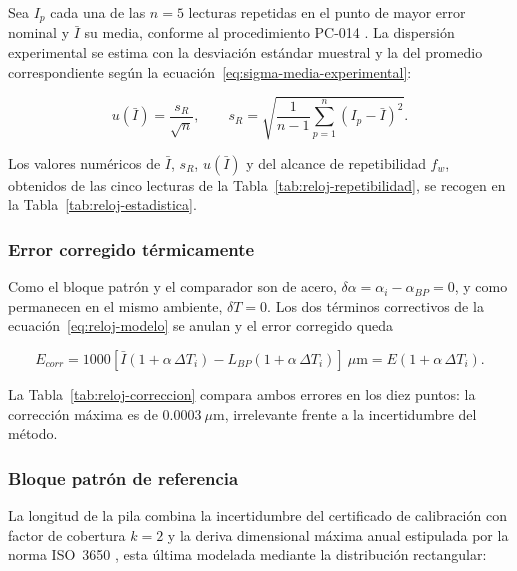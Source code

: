 Sea $I_p$ cada una de las $n = 5$ lecturas repetidas en el punto de mayor error
nominal y $\bar{I}$ su media, conforme al procedimiento PC-014
\parencite{inacal_pc014}. La dispersión experimental se estima con la desviación
estándar muestral y la del promedio correspondiente según la
ecuación~\eqref{eq:sigma-media-experimental}:

\begin{equation}
  u(\bar{I}) = \frac{s_R}{\sqrt{n}},
  \qquad
  s_R = \sqrt{\frac{1}{n-1} \sum_{p=1}^{n} (I_p - \bar{I})^2}.
  \label{eq:reloj-sigma-I}
\end{equation}



Los valores numéricos de $\bar I$, $s_R$, $u(\bar I)$ y del alcance de
repetibilidad $f_w$, obtenidos de las cinco lecturas de la
Tabla~\ref{tab:reloj-repetibilidad}, se recogen en la
Tabla~\ref{tab:reloj-estadistica}.

\subsubsection{Error corregido térmicamente}

Como el bloque patrón y el comparador son de acero,
$\delta\alpha = \alpha_i - \alpha_{BP} = 0$, y como permanecen en el mismo ambiente,
$\delta T = 0$. Los dos términos correctivos de la ecuación~\eqref{eq:reloj-modelo} se
anulan y el error corregido queda

\begin{equation}
    E_{corr} = 1000\left[\bar I(1 + \alpha\,\Delta T_i)
    - L_{BP}(1 + \alpha\,\Delta T_i)\right]\ \mu\text{m}
    = E(1 + \alpha\,\Delta T_i).
    \label{eq:reloj-E-corr}
\end{equation}

La Tabla~\ref{tab:reloj-correccion} compara ambos errores en los diez puntos: la
corrección máxima es de $0.0003\ \mu\text{m}$, irrelevante frente a la incertidumbre
del método.



\subsubsection*{Bloque patrón de referencia}

La longitud de la pila combina la incertidumbre del certificado de calibración con
factor de cobertura $k = 2$ y la deriva dimensional máxima anual estipulada por la
norma ISO~3650 \parencite{iso3650_1998}, esta última modelada mediante la distribución
rectangular:

